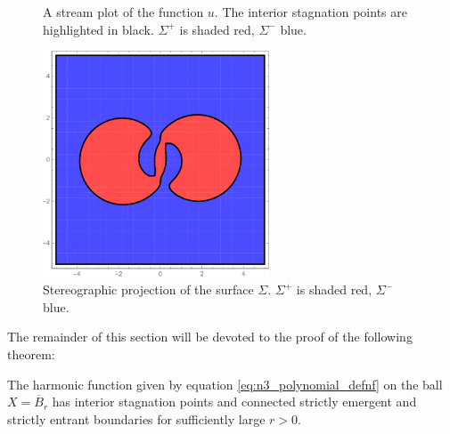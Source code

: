 \begin{example}
\begin{figure}
    \caption{A stream plot of the function $u$. The interior stagnation points are highlighted in black.
    $\Sigma^+$ is shaded red, $\Sigma^-$ blue.}
    \label{pl:n3_hf_inflowOutflowStagnationPoint_overview}
  \end{figure}
  \begin{figure}
    \centering
    \includegraphics[width=0.6\textwidth]{../plots/n3_hf_inflowOutflow_Ball_Surface_2.pdf}
    \caption{Stereographic projection of the surface $\Sigma$. $\Sigma^+$ is shaded red, $\Sigma^-$ blue.}
    \label{pl:n3_hf_inflowOutflowStagnationPoint_Surface}
  \end{figure}
\end{example}

The remainder of this section will be devoted to the proof of the following theorem:
\begin{theorem}\label{th:n3_polynomial_connectedInflowOutflow}
  The harmonic function given by equation \eqref{eq:n3_polynomial_defnf} on the ball $X=\overline{B}_r$
  has interior stagnation points and connected strictly emergent and strictly entrant
  boundaries for sufficiently large $r>0$.
\end{theorem}

